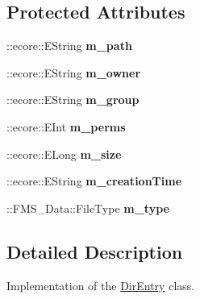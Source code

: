 \subsection*{Protected Attributes}
\begin{DoxyCompactItemize}
\item 
\hypertarget{classFMS__Data_1_1DirEntry_a97394a2d85680fda30a9ab0f065edbef}{
::ecore::EString {\bfseries m\_\-path}}
\label{classFMS__Data_1_1DirEntry_a97394a2d85680fda30a9ab0f065edbef}

\item 
\hypertarget{classFMS__Data_1_1DirEntry_a376a8bd41834c0b4823963dd8088462a}{
::ecore::EString {\bfseries m\_\-owner}}
\label{classFMS__Data_1_1DirEntry_a376a8bd41834c0b4823963dd8088462a}

\item 
\hypertarget{classFMS__Data_1_1DirEntry_a0d3c979387270db59e52b03aef90636e}{
::ecore::EString {\bfseries m\_\-group}}
\label{classFMS__Data_1_1DirEntry_a0d3c979387270db59e52b03aef90636e}

\item 
\hypertarget{classFMS__Data_1_1DirEntry_a0c424465b53429ad015bbefc98bee590}{
::ecore::EInt {\bfseries m\_\-perms}}
\label{classFMS__Data_1_1DirEntry_a0c424465b53429ad015bbefc98bee590}

\item 
\hypertarget{classFMS__Data_1_1DirEntry_a59eb9eb90bd94e0f5895c3e378ae5461}{
::ecore::ELong {\bfseries m\_\-size}}
\label{classFMS__Data_1_1DirEntry_a59eb9eb90bd94e0f5895c3e378ae5461}

\item 
\hypertarget{classFMS__Data_1_1DirEntry_a42ce19d63a30cdf0a5af09682fcb668d}{
::ecore::EString {\bfseries m\_\-creationTime}}
\label{classFMS__Data_1_1DirEntry_a42ce19d63a30cdf0a5af09682fcb668d}

\item 
\hypertarget{classFMS__Data_1_1DirEntry_af28e5597963733c89c8a32ad03bf62cb}{
::FMS\_\-Data::FileType {\bfseries m\_\-type}}
\label{classFMS__Data_1_1DirEntry_af28e5597963733c89c8a32ad03bf62cb}

\end{DoxyCompactItemize}


\subsection{Detailed Description}
Implementation of the \hyperlink{classFMS__Data_1_1DirEntry}{DirEntry} class. 

